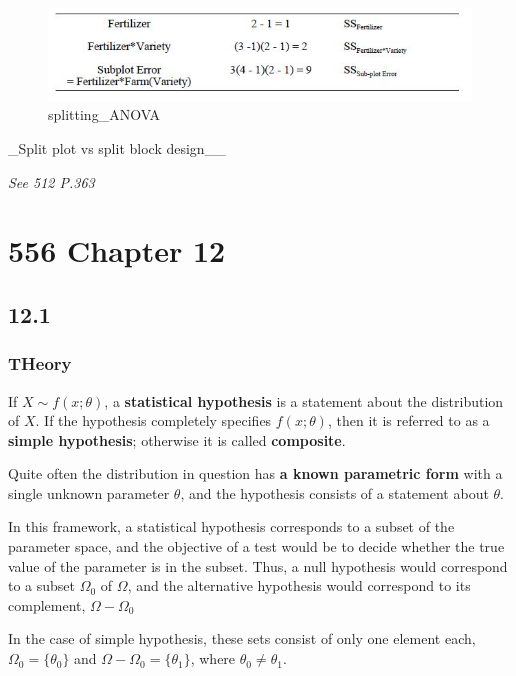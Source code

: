 \documentclass[]{book}
\begin{document}
\begin{figure}
\centering
\includegraphics{splitting_ANOVA.jpg}
\caption{splitting\_ANOVA}
\end{figure}

\_Split plot vs split block design\_\_

\emph{See 512 P.363}

\hypertarget{chapter-12}{%
\chapter{556 Chapter 12}\label{chapter-12}}

\hypertarget{section-4}{%
\section{12.1}\label{section-4}}

\hypertarget{theory}{%
\subsection{THeory}\label{theory}}

If \(X \sim f(x;\theta)\), a \textbf{statistical hypothesis} is a statement about the distribution of \(X\). If the hypothesis completely specifies \(f(x;\theta)\), then it is referred to as a \textbf{simple hypothesis}; otherwise it is called \textbf{composite}.

Quite often the distribution in question has \textbf{a known parametric form} with a single unknown parameter \(\theta\), and the hypothesis consists of a statement about \(\theta\).

In this framework, a statistical hypothesis corresponds to a subset of the parameter space, and the objective of a test would be to decide whether the true value of the parameter is in the subset. Thus, a null hypothesis would correspond to a subset \(\Omega_0\) of \(\Omega\), and the alternative hypothesis would correspond to its complement, \(\Omega-\Omega_0\)

In the case of simple hypothesis, these sets consist of only one element each, \(\Omega_0=\{ \theta_0\}\) and \(\Omega -\Omega_0=\{ \theta_1\}\), where \(\theta_0 \neq \theta_1\).
\end{document}
